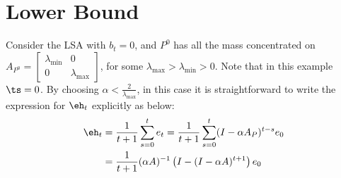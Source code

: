 \section{Lower Bound}
Consider the LSA with $b_t=0$, and $P^0$ has all the mass concentrated on $A_{P^0}=\begin{bmatrix} \lambda_{\min} &0\\ 0& \lambda_{\max}\end{bmatrix}$, for some $\lambda_{\max}>\lambda_{\min}>0$. Note that in this example $\ts=0$.
By choosing $\alpha<\frac2{\lambda_{\max}}$, in this case it is straightforward to write the expression for $\eh_t$ explicitly as below:
\begin{align*}
\eh_t&=\frac{1}{t+1}\sum_{s=0}^t e_t = \frac{1}{t+1}\sum_{s=0}^t (I-\alpha A_P)^{t-s} e_0\\
&=\frac{1}{t+1}(\alpha A)^{-1}\left(I-(I-\alpha A)^{t+1}\right)e_0
\end{align*}
\begin{comment}
\begin{align*}
\norm{\eh_t}^2&=\frac{1}{(t+1)^2}\norm{(\alpha A_P)^{-1}\left(I-(I-\alpha A_P)^{t+1}\right)e_0}^2
&\leq\frac{1}{(t+1)^2}\alpha^2\norm{A_P^{-1}}^2\norm{e_0}^2
\end{align*}
\end{comment}

